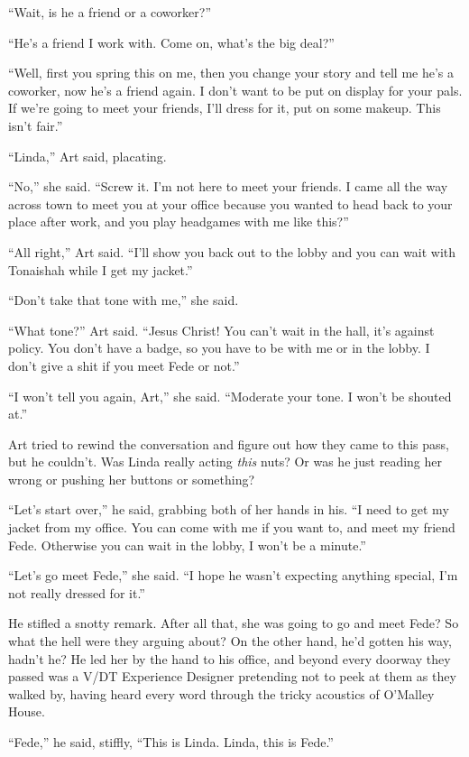 “Wait, is he a friend or a coworker?”

“He’s a friend I work with. Come on, what’s the big deal?”

“Well, first you spring this on me, then you change your story and
tell me he’s a coworker, now he’s a friend again. I don’t want to
be put on display for your pals. If we’re going to meet your
friends, I’ll dress for it, put on some makeup. This isn’t fair.”

“Linda,” Art said, placating.

“No,” she said. “Screw it. I’m not here to meet your friends. I
came all the way across town to meet you at your office because you
wanted to head back to your place after work, and you play
headgames with me like this?”

“All right,” Art said. “I’ll show you back out to the lobby and you
can wait with Tonaishah while I get my jacket.”

“Don’t take that tone with me,” she said.

“What tone?” Art said. “Jesus Christ! You can’t wait in the hall,
it’s against policy. You don’t have a badge, so you have to be with
me or in the lobby. I don’t give a shit if you meet Fede or not.”

“I won’t tell you again, Art,” she said. “Moderate your tone. I
won’t be shouted at.”

Art tried to rewind the conversation and figure out how they came
to this pass, but he couldn’t. Was Linda really acting \emph{this}
nuts? Or was he just reading her wrong or pushing her buttons or
something?

“Let’s start over,” he said, grabbing both of her hands in his. “I
need to get my jacket from my office. You can come with me if you
want to, and meet my friend Fede. Otherwise you can wait in the
lobby, I won’t be a minute.”

“Let’s go meet Fede,” she said. “I hope he wasn’t expecting
anything special, I’m not really dressed for it.”

He stifled a snotty remark. After all that, she was going to go and
meet Fede? So what the hell were they arguing about? On the other
hand, he’d gotten his way, hadn’t he? He led her by the hand to his
office, and beyond every doorway they passed was a V/DT Experience
Designer pretending not to peek at them as they walked by, having
heard every word through the tricky acoustics of O’Malley House.

“Fede,” he said, stiffly, “This is Linda. Linda, this is Fede.”

